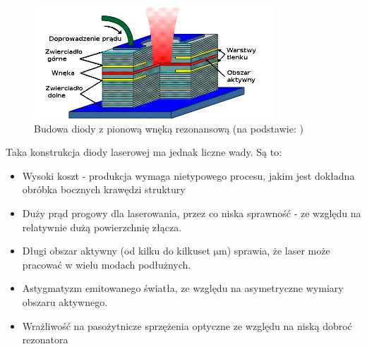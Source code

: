 \documentclass[a4paper,10pt]{article}
\begin{document}
\begin{figure}
\begin{center}
 \includegraphics[width=0.8\textwidth]{./obrazki/rys-vcsel.png}
\end{center}
\caption{Budowa diody z pionową wnęką rezonansową (na podstawie: \cite{rys-laserki})}
\label{rys-vcsel}
\end{figure}

Taka konstrukcja diody laserowej ma jednak liczne wady. Są to:
\begin{itemize}
 \item Wysoki koszt - produkcja wymaga nietypowego procesu, jakim jest dokładna obróbka bocznych krawędzi struktury
 \item Duży prąd progowy dla laserowania, przez co niska sprawność - ze względu na relatywnie dużą powierzchnię złącza.
 \item Długi obszar aktywny (od kilku do kilkuset $\mathrm{\mu m}$) sprawia, że laser może pracować w wielu modach podłużnych.
 \item Astygmatyzm emitowanego światła, ze względu na asymetryczne wymiary obszaru aktywnego.
 \item Wrażliwość na pasożytnicze sprzężenia optyczne ze względu na niską dobroć rezonatora
\end{itemize}
\end{document}
